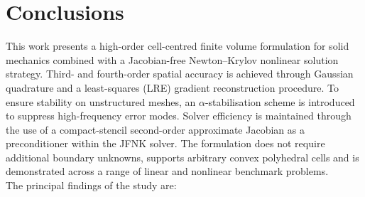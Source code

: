\documentclass[sn-mathphys,Numbered]{sn-jnl}%
\begin{document}
\section{Conclusions} \label{sec:conclusion}
This work presents a high-order cell-centred finite volume formulation for solid mechanics combined with a Jacobian-free Newton–Krylov nonlinear solution strategy. 
Third- and fourth-order spatial accuracy is achieved through Gaussian quadrature and a least-squares (LRE) gradient reconstruction procedure.
To ensure stability on unstructured meshes, an $\alpha$-stabilisation scheme is introduced to suppress high-frequency error modes. 
Solver efficiency is maintained through the use of a compact-stencil second-order approximate Jacobian as a preconditioner within the JFNK solver.
The formulation does not require additional boundary unknowns, supports arbitrary convex polyhedral cells and is demonstrated across a range of linear and nonlinear benchmark problems.
\\
The principal findings of the study are:
%
\end{document}
